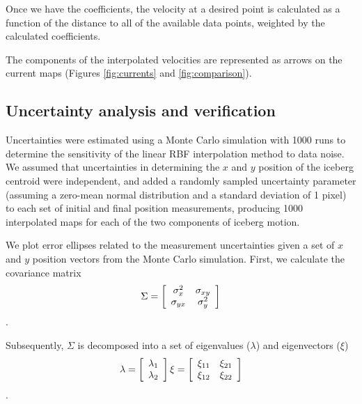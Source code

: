 Once we have the coefficients, the velocity at a desired point is calculated as a function of the distance to all of the available data points, weighted by the calculated coefficients.

The components of the interpolated velocities are represented as arrows on the current maps (Figures \ref{fig:currents} and \ref{fig:comparison}).

\subsection{Uncertainty analysis and verification}

Uncertainties were estimated using a Monte Carlo simulation with 1000 runs to determine the sensitivity of the linear RBF interpolation method to data noise. We assumed that uncertainties in determining the $x$ and $y$ position of the iceberg centroid were independent, and added a randomly sampled uncertainty parameter (assuming a zero-mean normal distribution and a standard deviation of 1 pixel) to each set of initial and final position measurements, producing 1000 interpolated maps for each of the two components of iceberg motion. 



We plot error ellipses related to the measurement uncertainties given a set of $x$ and $y$ position vectors from the Monte Carlo simulation. First, we calculate the covariance matrix
\begin{equation}
 \Sigma= \left[
  \begin{array}{ c c }
     \sigma_{x}^{2} & \sigma_{xy} \\
     \sigma_{yx} & \sigma_{y}^{2} 
  \end{array} \right]
\end{equation}.

Subsequently, $\Sigma$ is decomposed into a set of eigenvalues ($\lambda$) and eigenvectors ($\xi$)
\begin{equation}
\lambda=
 \left[ \begin{array}{c}
     \lambda_1  \\
     \lambda_2
  \end{array} \right]
\xi=
 \left[ \begin{array}{ c c }
     \xi_{11} & \xi_{21} \\
     \xi_{12} & \xi_{22}
  \end{array} \right]
\end{equation}.


